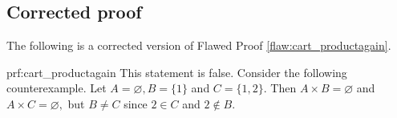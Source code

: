 \clearpage
\subsection{Corrected proof}

The following is a corrected version of Flawed Proof \ref{flaw:cart_productagain}. %

\begin{prf}{prf:cart_productagain} %
This statement is false. Consider the following counterexample. Let $A = \varnothing, B = \{1\}$ and $C=\{1,2\}.$ Then $A \times B = \varnothing$ and $A \times C = \varnothing,$ but $B \neq C$ since $2 \in C$  and $2 \notin B.$
\end{prf}